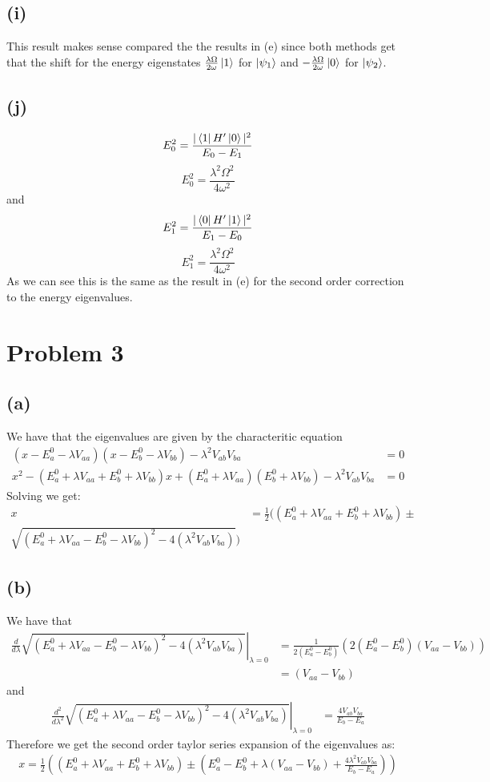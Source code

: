 \documentclass[11pt]{article}
\begin{document}
\subsection*{(i)}
This result makes sense compared the the results in (e) since both methods get
that the shift for the energy eigenstates $\frac{\lambda\Omega}{2\omega}\ket{1}$ for 
$\ket{\psi_1}$ and $-\frac{\lambda\Omega}{2\omega}\ket{0}$ for $\ket{\psi_2}$.
\subsection*{(j)}
$$E_{0}^{2}=\frac{|\bra{1}H'\ket{0}|^2}{E_{0}-E_{1}}$$
$$E_{0}^{2}=\frac{\lambda^2\Omega^2}{4\omega^2}$$
and
$$E_{1}^{2}=\frac{|\bra{0}H'\ket{1}|^2}{E_{1}-E_{0}}$$
$$E_{1}^{2}=\frac{\lambda^2\Omega^2}{4\omega^2}$$
As we can see this is the same as the result in (e) for the second order correction to 
the energy eigenvalues.
\section*{Problem 3}
\subsection*{(a)}
We have that the eigenvalues are given by the characteritic equation
\begin{align*}
    (x-E_a^0-\lambda V_{aa})(x-E_b^0-\lambda V_{bb})-\lambda^2V_{ab}V_{ba}&=0\\
    x^2-(E_a^0+\lambda V_{aa}+E_b^0+\lambda V_{bb})x+(E_a^0+\lambda V_{aa})
(E_b^0+\lambda V_{bb})-\lambda^2V_{ab}V_{ba}&=0
\end{align*}
Solving we get:
\begin{align*}
    x&=\frac{1}{2}((E_a^0+\lambda V_{aa}+E_b^0+\lambda V_{bb})\pm\\
    \sqrt{(E_a^0+\lambda V_{aa}-E_b^0-\lambda V_{bb})^2-4(\lambda^2V_{ab}V_{ba})})
\end{align*}
\subsection*{(b)}
We have that 
\begin{align*}
    \left.\frac{d}{d\lambda}\sqrt{(E_a^0+\lambda V_{aa}-E_b^0-\lambda V_{bb})^2-4(\lambda^2V_{ab}V_{ba})}\right|_{\lambda=0} &= 
    \frac{1}{2(E_a^0-E_b^0)}(2(E_a^0-E_b^0)(V_{aa}-V_{bb}))\\
    &=(V_{aa}-V_{bb})
\end{align*}
and
\begin{align*}
    \left.\frac{d^2}{d\lambda^2}\sqrt{(E_a^0+\lambda V_{aa}-E_b^0-\lambda V_{bb})^2-4(\lambda^2V_{ab}V_{ba})}\right|_{\lambda=0} &=
    \frac{4 V_{ab}V_{ba}}{E_b-E_a}
\end{align*}
Therefore we get the second order taylor series expansion of the 
eigenvalues as:
\begin{align*}
    x = \frac{1}{2}\left((E_a^0+\lambda V_{aa}+E_b^0+\lambda V_{bb})
    \pm\left(E_a^0-E_b^0+\lambda(V_{aa}-V_{bb})+\frac{4 \lambda^2V_{ab}V_{ba}}{E_b-E_a}\right)\right)
\end{align*}
\end{document}
